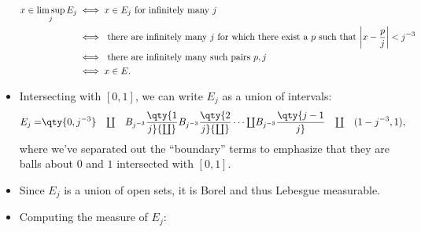 \begin{solution}
\begin{itemize}
  \begin{align*}
  x \in \limsup_j E_j 
  &\iff x \in E_j \text{ for infinitely many } j  \\
  &\iff \text{ there are infinitely many $j$ for which there exist a $p$ such that } {\left\lvert {x - {p\over j}} \right\rvert} < j^{-3}  \\
  &\iff \text{ there are infinitely many such pairs $p, j$}  \\
  &\iff x\in E
  .\end{align*}
\item
  Intersecting with \([0, 1]\), we can write \(E_j\) as a union of
  intervals:
  \begin{align*}
  E_j =& \qty{0, {j^{-3}}} 
  \quad {\textstyle\coprod}\quad 
  B_{j^{-3}}\qty{1\over j} {\textstyle\coprod}
  B_{j^{-3}}\qty{2\over j} {\textstyle\coprod}
  \cdots {\textstyle\coprod}
  B_{j^{-3}}\qty{j-1\over j} 
  \quad {\textstyle\coprod}\quad 
  (1 - {j^{-3}}, 1)
  ,\end{align*}
  where we've separated out the ``boundary'' terms to emphasize that
  they are balls about \(0\) and \(1\) intersected with \([0, 1]\).
\item
  Since \(E_j\) is a union of open sets, it is Borel and thus Lebesgue
  measurable.
\item
  Computing the measure of \(E_j\):


\end{itemize}
\end{solution}
